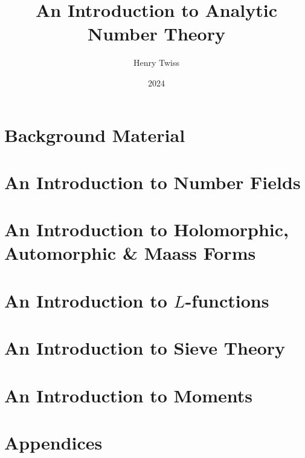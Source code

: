 \documentclass[12pt,oneside]{book}
\title{An Introduction to Analytic Number Theory}
\author{Henry Twiss}
\date{2024}
\begin{document}
\maketitle
\pagestyle{empty}
\tableofcontents
\setcounter{page}{0}
\pagestyle{fancy}

\part{Background Material}
  

\part{An Introduction to Number Fields}
  

\part{An Introduction to Holomorphic, Automorphic \& Maass Forms}
  
  
  
  

\part{An Introduction to \texorpdfstring{$L$}{L}-functions}
  
  
  

\part{An Introduction to Sieve Theory}
  
  

\part{An Introduction to Moments}
  
  

\part{Appendices}
  

\printindex


\end{document}
